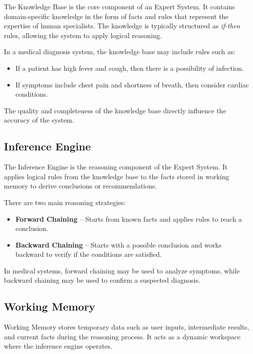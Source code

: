 \documentclass[12pt]{article}
\begin{document}
The Knowledge Base is the core component of an Expert System. It contains domain-specific knowledge in the form of facts and rules that represent the expertise of human specialists. The knowledge is typically structured as \textit{if-then} rules, allowing the system to apply logical reasoning.

In a medical diagnosis system, the knowledge base may include rules such as:
\begin{itemize}
    \item If a patient has high fever and cough, then there is a possibility of infection.
    \item If symptoms include chest pain and shortness of breath, then consider cardiac conditions.
\end{itemize}

The quality and completeness of the knowledge base directly influence the accuracy of the system.

\subsection{Inference Engine}

The Inference Engine is the reasoning component of the Expert System. It applies logical rules from the knowledge base to the facts stored in working memory to derive conclusions or recommendations.

There are two main reasoning strategies:
\begin{itemize}
    \item \textbf{Forward Chaining} -- Starts from known facts and applies rules to reach a conclusion.
    \item \textbf{Backward Chaining} -- Starts with a possible conclusion and works backward to verify if the conditions are satisfied.
\end{itemize}

In medical systems, forward chaining may be used to analyze symptoms, while backward chaining may be used to confirm a suspected diagnosis.

\subsection{Working Memory}

Working Memory stores temporary data such as user inputs, intermediate results, and current facts during the reasoning process. It acts as a dynamic workspace where the inference engine operates.
\end{document}
